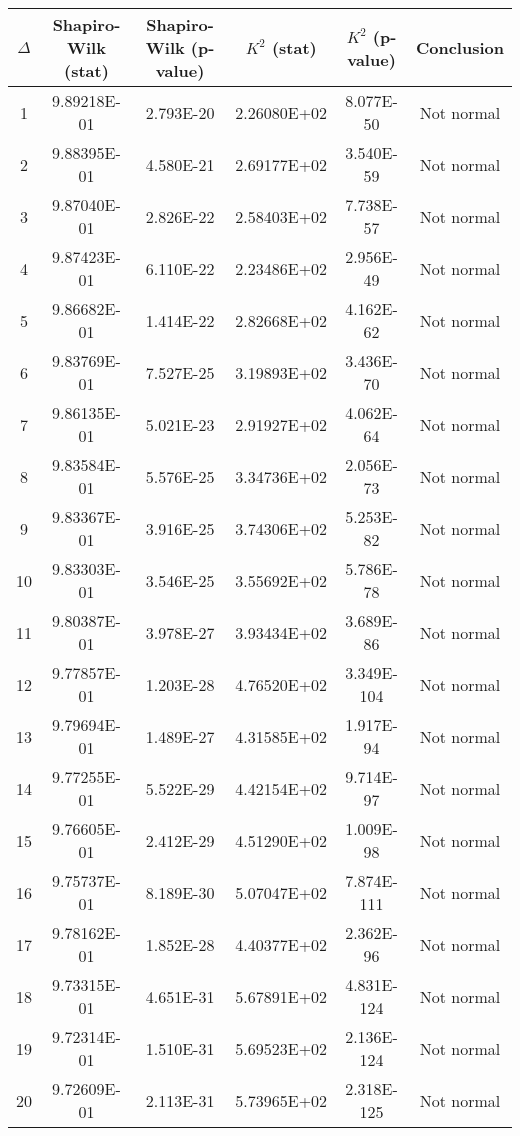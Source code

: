 \begin{table}[h]
	\begin{tabular}{|c|c|c|c|c|c|}
		\hline
		$\Delta$ &  Shapiro-Wilk (stat) & Shapiro-Wilk (p-value) & $K^2$ (stat) & $K^2$ (p-value) & Conclusion\\\hline
		\hline
		1 & 9.89218E-01 & 2.793E-20 & 2.26080E+02 & 8.077E-50 & Not normal\\\hline
		2 & 9.88395E-01 & 4.580E-21 & 2.69177E+02 & 3.540E-59 & Not normal\\\hline
		3 & 9.87040E-01 & 2.826E-22 & 2.58403E+02 & 7.738E-57 & Not normal\\\hline
		4 & 9.87423E-01 & 6.110E-22 & 2.23486E+02 & 2.956E-49 & Not normal\\\hline
		5 & 9.86682E-01 & 1.414E-22 & 2.82668E+02 & 4.162E-62 & Not normal\\\hline
		6 & 9.83769E-01 & 7.527E-25 & 3.19893E+02 & 3.436E-70 & Not normal\\\hline
		7 & 9.86135E-01 & 5.021E-23 & 2.91927E+02 & 4.062E-64 & Not normal\\\hline
		8 & 9.83584E-01 & 5.576E-25 & 3.34736E+02 & 2.056E-73 & Not normal\\\hline
		9 & 9.83367E-01 & 3.916E-25 & 3.74306E+02 & 5.253E-82 & Not normal\\\hline
		10 & 9.83303E-01 & 3.546E-25 & 3.55692E+02 & 5.786E-78 & Not normal\\\hline
		11 & 9.80387E-01 & 3.978E-27 & 3.93434E+02 & 3.689E-86 & Not normal\\\hline
		12 & 9.77857E-01 & 1.203E-28 & 4.76520E+02 & 3.349E-104 & Not normal\\\hline
		13 & 9.79694E-01 & 1.489E-27 & 4.31585E+02 & 1.917E-94 & Not normal\\\hline
		14 & 9.77255E-01 & 5.522E-29 & 4.42154E+02 & 9.714E-97 & Not normal\\\hline
		15 & 9.76605E-01 & 2.412E-29 & 4.51290E+02 & 1.009E-98 & Not normal\\\hline
		16 & 9.75737E-01 & 8.189E-30 & 5.07047E+02 & 7.874E-111 & Not normal\\\hline
		17 & 9.78162E-01 & 1.852E-28 & 4.40377E+02 & 2.362E-96 & Not normal\\\hline
		18 & 9.73315E-01 & 4.651E-31 & 5.67891E+02 & 4.831E-124 & Not normal\\\hline
		19 & 9.72314E-01 & 1.510E-31 & 5.69523E+02 & 2.136E-124 & Not normal\\\hline
		20 & 9.72609E-01 & 2.113E-31 & 5.73965E+02 & 2.318E-125 & Not normal\\\hline

\end{tabular}
\end{table}
